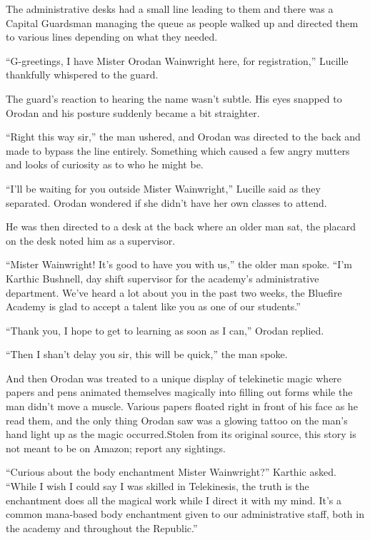 \documentclass[a4paper,10pt]{book}
\begin{document}
The administrative desks had a small line leading to them and there was a Capital Guardsman managing the queue as people walked up and directed them to various lines depending on what they needed.\par
“G-greetings, I have Mister Orodan Wainwright here, for registration,” Lucille thankfully whispered to the guard.\par
The guard’s reaction to hearing the name wasn’t subtle. His eyes snapped to Orodan and his posture suddenly became a bit straighter.\par
“Right this way sir,” the man ushered, and Orodan was directed to the back and made to bypass the line entirely. Something which caused a few angry mutters and looks of curiosity as to who he might be.\par
“I’ll be waiting for you outside Mister Wainwright,” Lucille said as they separated. Orodan wondered if she didn’t have her own classes to attend.\par
He was then directed to a desk at the back where an older man sat, the placard on the desk noted him as a supervisor.\par
“Mister Wainwright! It’s good to have you with us,” the older man spoke. “I’m Karthic Bushnell, day shift supervisor for the academy’s administrative department. We’ve heard a lot about you in the past two weeks, the Bluefire Academy is glad to accept a talent like you as one of our students.”\par
“Thank you, I hope to get to learning as soon as I can,” Orodan replied.\par
“Then I shan’t delay you sir, this will be quick,” the man spoke.\par
And then Orodan was treated to a unique display of telekinetic magic where papers and pens animated themselves magically into filling out forms while the man didn’t move a muscle. Various papers floated right in front of his face as he read them, and the only thing Orodan saw was a glowing tattoo on the man’s hand light up as the magic occurred.Stolen from its original source, this story is not meant to be on Amazon; report any sightings.\par
“Curious about the body enchantment Mister Wainwright?” Karthic asked. “While I wish I could say I was skilled in Telekinesis, the truth is the enchantment does all the magical work while I direct it with my mind. It’s a common mana-based body enchantment given to our administrative staff, both in the academy and throughout the Republic.”\par
\end{document}
